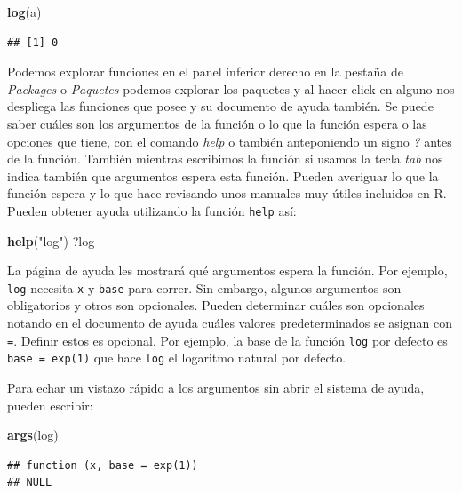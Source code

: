 \documentclass[
]{book}
\newenvironment{Shaded}{\begin{snugshade}}{\end{snugshade}}
\newcommand{\FunctionTok}[1]{\textcolor[rgb]{0.13,0.29,0.53}{\textbf{#1}}}
\newcommand{\NormalTok}[1]{#1}
\newcommand{\StringTok}[1]{\textcolor[rgb]{0.31,0.60,0.02}{#1}}
\begin{document}
\begin{Shaded}
\begin{Highlighting}[]
\FunctionTok{log}\NormalTok{(a)}
\end{Highlighting}
\end{Shaded}

\begin{verbatim}
## [1] 0
\end{verbatim}

Podemos explorar funciones en el panel inferior derecho en la pestaña de \emph{Packages} o \emph{Paquetes} podemos explorar los paquetes y al hacer click en alguno nos despliega las funciones que posee y su documento de ayuda también.
Se puede saber cuáles son los argumentos de la función o lo que la función espera o las opciones que tiene, con el comando \emph{help} o también anteponiendo un signo \emph{?} antes de la función.
También mientras escribimos la función si usamos la tecla \emph{tab} nos indica también que argumentos espera esta función.
Pueden averiguar lo que la función espera y lo que hace revisando unos manuales muy útiles incluidos en R.
Pueden obtener ayuda utilizando la función \texttt{help} así:

\begin{Shaded}
\begin{Highlighting}[]
\FunctionTok{help}\NormalTok{(}\StringTok{"log"}\NormalTok{)}
\NormalTok{?log}
\end{Highlighting}
\end{Shaded}

La página de ayuda les mostrará qué argumentos espera la función.
Por ejemplo, \texttt{log} necesita \texttt{x} y \texttt{base} para correr.
Sin embargo, algunos argumentos son obligatorios y otros son opcionales.
Pueden determinar cuáles son opcionales notando en el documento de ayuda cuáles valores predeterminados se asignan con \texttt{=}.
Definir estos es opcional.
Por ejemplo, la base de la función \texttt{log} por defecto es \texttt{base\ =\ exp(1)} que hace \texttt{log} el logaritmo natural por defecto.

Para echar un vistazo rápido a los argumentos sin abrir el sistema de ayuda, pueden escribir:

\begin{Shaded}
\begin{Highlighting}[]
\FunctionTok{args}\NormalTok{(log)}
\end{Highlighting}
\end{Shaded}

\begin{verbatim}
## function (x, base = exp(1)) 
## NULL
\end{verbatim}
\end{document}
